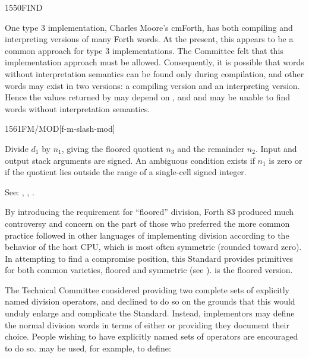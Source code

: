 \begin{newword}{1550}{FIND}
\begin{rationale}
		One type 3 implementation, Charles Moore's cmForth, has both
		compiling and interpreting versions of many Forth words. At the
		present, this appears to be a common approach for type 3
		implementations. The Committee felt that this implementation
		approach must be allowed. Consequently, it is possible that
		words without interpretation semantics can be found only during
		compilation, and other words may exist in two versions: a
		compiling version and an interpreting version. Hence the values
		returned by  may depend on , and 
		and \word{[']} may be unable to find words without
		interpretation semantics.
	\end{rationale}
\end{newword}


\begin{newword}{1561}{FM/MOD}[f-m-slash-mod]

	Divide $d_1$ by $n_1$, giving the floored quotient $n_3$ and the
	remainder $n_2$. Input and output stack arguments are signed. An
	ambiguous condition exists if $n_1$ is zero or if the quotient
	lies outside the range of a single-cell signed integer.

\item[See:]
	,
	,
	.

	\begin{rationale} %
		By introducing the requirement for ``floored'' division,
		Forth 83 produced much controversy and concern on the part of
		those who preferred the more common practice followed in other
		languages of implementing division according to the behavior
		of the host CPU, which is most often symmetric (rounded toward
		zero). In attempting to find a compromise position, this
		Standard provides primitives for both common varieties, floored
		and symmetric (see ).  is the floored
		version.

		The Technical Committee considered providing two complete sets
		of explicitly named division operators, and declined to do so
		on the grounds that this would unduly enlarge and complicate
		the Standard. Instead, implementors may define the normal
		division words in terms of either  or
		 providing they document their choice. People
		wishing to have explicitly named sets of operators are
		encouraged to do so.  may be used, for example,
		to define:


\end{rationale}
\end{newword}
